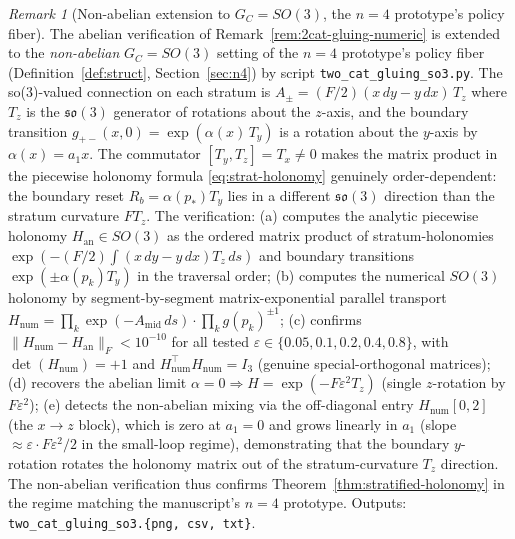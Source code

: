 \documentclass[11pt,a4paper]{article}
\theoremstyle{plain}
\theoremstyle{definition}
\theoremstyle{remark}
\newtheorem{remark}[theorem]{Remark}
\newcommand{\so}{\mathfrak{so}}
\begin{document}
\begin{remark}[Non-abelian extension to $G_C = SO(3)$, the $n=4$
prototype's policy fiber]
\label{rem:2cat-gluing-so3}
The abelian verification of Remark~\ref{rem:2cat-gluing-numeric} is
extended to the \emph{non-abelian} $G_C = SO(3)$ setting of the $n=4$
prototype's policy fiber (Definition~\ref{def:struct},
Section~\ref{sec:n4}) by script \texttt{two\_cat\_gluing\_so3.py}. The
so(3)-valued connection on each stratum is $A_\pm = (F/2)(x\,dy - y\,dx)
\,T_z$ where $T_z$ is the $\so(3)$ generator of rotations about the
$z$-axis, and the boundary transition
$g_{+-}(x, 0) = \exp(\alpha(x) \, T_y)$ is a rotation about the
$y$-axis by $\alpha(x) = a_1 x$. The commutator $[T_y, T_z] = T_x \neq
0$ makes the matrix product in the piecewise holonomy formula
\eqref{eq:strat-holonomy} genuinely order-dependent: the boundary reset
$R_b = \alpha(p_*) T_y$ lies in a different $\so(3)$ direction than the
stratum curvature $F T_z$. The verification: (a) computes the analytic
piecewise holonomy $H_{\mathrm{an}} \in SO(3)$ as the ordered matrix
product of stratum-holonomies $\exp(-(F/2) \int (x\,dy - y\,dx) T_z\,ds)$
and boundary transitions $\exp(\pm \alpha(p_k) T_y)$ in the traversal
order; (b) computes the numerical $SO(3)$ holonomy by segment-by-segment
matrix-exponential parallel transport
$H_{\mathrm{num}} = \prod_k \exp(-A_{\mathrm{mid}}\,ds) \cdot \prod_k
g(p_k)^{\pm 1}$; (c) confirms
$\|H_{\mathrm{num}} - H_{\mathrm{an}}\|_F < 10^{-10}$ for all tested
$\varepsilon \in \{0.05, 0.1, 0.2, 0.4, 0.8\}$, with
$\det(H_{\mathrm{num}}) = +1$ and $H_{\mathrm{num}}^\top H_{\mathrm{num}}
= I_3$ (genuine special-orthogonal matrices); (d) recovers the abelian
limit $\alpha = 0 \Rightarrow H = \exp(-F \varepsilon^2 T_z)$ (single
$z$-rotation by $F \varepsilon^2$); (e) detects the non-abelian
mixing via the off-diagonal entry $H_{\mathrm{num}}[0, 2]$ (the
$x \to z$ block), which is zero at $a_1 = 0$ and grows linearly in
$a_1$ (slope $\approx \varepsilon \cdot F \varepsilon^2 / 2$ in the
small-loop regime), demonstrating that the boundary $y$-rotation
rotates the holonomy matrix out of the stratum-curvature $T_z$ direction.
The non-abelian verification thus confirms Theorem~\ref{thm:stratified-holonomy}
in the regime matching the manuscript's $n=4$ prototype. Outputs:
\texttt{two\_cat\_gluing\_so3.\{png, csv, txt\}}.
\end{remark}
\end{document}
